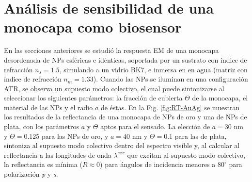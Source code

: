 \section{Análisis de sensibilidad  de una monocapa como biosensor}
\label{section:sensLambda}

En las secciones anteriores se estudió la respuesta EM de una monocapa desordenada de NPs esféricas e idénticas, soportada por un sustrato con índice de refracción $n_s=1.5$, simulando a un vidrio BK7, e inmersa en en agua (matriz con índice de refracción $n_m=1.33$). Cuando las NPs se iluminan en una configuración ATR, se observa un supuesto modo colectivo, el cual puede sintonizarse al seleccionar los siguientes parámetros: la fracción de cubierta $\Theta$ de la monocapa, el material de las NPs y el radio $a$ de éstas. En la Fig. \ref{fig:RT-AuAg} se muestran los resultados de la reflectancia de una monocapa de NPs de oro y una de NPs de plata, con los parámetros $a$ y $\Theta$ aptos para el sensado. La elección de $a=30$ nm y $\Theta=0.125$ para las NPs de oro, y $a=40$ nm y $\Theta=0.1$ para las de plata, sintoniza al supuesto modo colectivo dentro del espectro visible y, al calcular al reflectancia a las longitudes de onda $\lambda^{exc}$ que excitan al supuesto modo colectivo, la reflectancia es mínima ($R\approx 0 $) para ángulos de incidencia menores a $80^\circ$ para polarización \emph{p} y \emph{s}.

